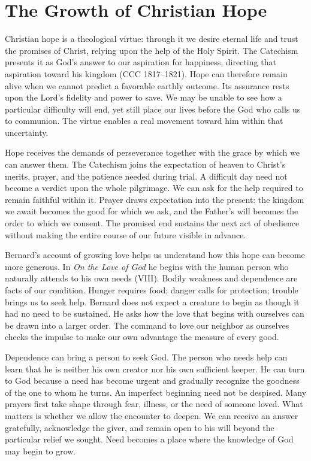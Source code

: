 \section{The Growth of Christian Hope}

Christian hope is a theological virtue: through it we desire eternal life and trust the promises of Christ, relying upon the help of the Holy Spirit. The Catechism presents it as God's answer to our aspiration for happiness, directing that aspiration toward his kingdom (CCC 1817--1821). Hope can therefore remain alive when we cannot predict a favorable earthly outcome. Its assurance rests upon the Lord's fidelity and power to save. We may be unable to see how a particular difficulty will end, yet still place our lives before the God who calls us to communion. The virtue enables a real movement toward him within that uncertainty.

Hope receives the demands of perseverance together with the grace by which we can answer them. The Catechism joins the expectation of heaven to Christ's merits, prayer, and the patience needed during trial. A difficult day need not become a verdict upon the whole pilgrimage. We can ask for the help required to remain faithful within it. Prayer draws expectation into the present: the kingdom we await becomes the good for which we ask, and the Father's will becomes the order to which we consent. The promised end sustains the next act of obedience without making the entire course of our future visible in advance.

Bernard's account of growing love helps us understand how this hope can become more generous. In \emph{On the Love of God} he begins with the human person who naturally attends to his own needs (VIII). Bodily weakness and dependence are facts of our condition. Hunger requires food; danger calls for protection; trouble brings us to seek help. Bernard does not expect a creature to begin as though it had no need to be sustained. He asks how the love that begins with ourselves can be drawn into a larger order. The command to love our neighbor as ourselves checks the impulse to make our own advantage the measure of every good.

Dependence can bring a person to seek God. The person who needs help can learn that he is neither his own creator nor his own sufficient keeper. He can turn to God because a need has become urgent and gradually recognize the goodness of the one to whom he turns. An imperfect beginning need not be despised. Many prayers first take shape through fear, illness, or the need of someone loved. What matters is whether we allow the encounter to deepen. We can receive an answer gratefully, acknowledge the giver, and remain open to his will beyond the particular relief we sought. Need becomes a place where the knowledge of God may begin to grow.

